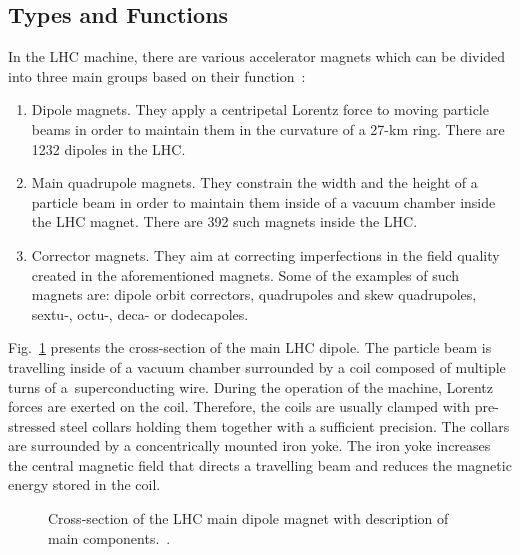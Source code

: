 
\subsection{Types and Functions}

In the LHC machine, there are various accelerator magnets which can be divided into three main groups based on their function~\cite{cern_main_webpage}: 
\begin{enumerate}
    \item Dipole magnets. They apply a centripetal Lorentz force to moving particle beams in order to maintain them in the curvature of a 27-km ring. There are 1232 dipoles in the LHC.
    \item Main quadrupole magnets. They constrain the width and the height of a particle beam in order to maintain them inside of a vacuum chamber inside the LHC magnet. There are 392 such magnets inside the LHC.
    \item Corrector magnets. They aim at correcting imperfections in the field quality created in the aforementioned magnets. Some of the examples of such magnets are: dipole orbit correctors, quadrupoles and skew quadrupoles, sextu-, octu-, deca- or dodecapoles. 
\end{enumerate}

Fig.~\ref{fig:cross_section_lhc_main_dipole} presents the cross-section of the main LHC dipole. The particle beam is travelling inside of a vacuum chamber surrounded by a coil composed of multiple turns of a~superconducting wire. During the operation of the machine, Lorentz forces are exerted on the coil. Therefore, the coils are usually clamped with pre-stressed steel collars holding them together with a sufficient precision. The collars are surrounded by a concentrically mounted iron yoke. The iron yoke increases the central magnetic field that directs a travelling beam and reduces the magnetic energy stored in the coil.

\begin{figure}[H]
    \centering
    \caption{Cross-section of the LHC main dipole magnet with description of main components.~\cite{lhc_main_dipole_cross_section}.}
    \label{fig:cross_section_lhc_main_dipole}
\end{figure}

